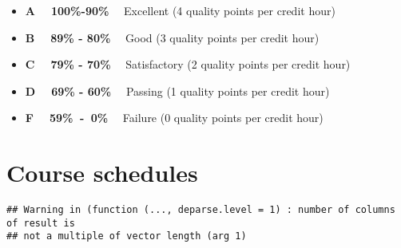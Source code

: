\documentclass[
]{article}
\providecommand{\tightlist}{%
  \setlength{\itemsep}{0pt}\setlength{\parskip}{0pt}}
\begin{document}
\begin{itemize}
\tightlist
\item
  \textbf{A \(~~~\) 100\%-90\%} \(~~~\) Excellent (4 quality points per
  credit hour)
\item
  \textbf{B \(~~~\) 89\% - 80\%} \(~~~\) Good (3 quality points per
  credit hour)
\item
  \textbf{C \(~~~\) 79\% - 70\%} \(~~~\) Satisfactory (2 quality points
  per credit hour)
\item
  \textbf{D \(~~~\) 69\% - 60\%} \(~~~\) Passing (1 quality points per
  credit hour)
\item
  \textbf{F \(~~~\) 59\% \(~\)-\(~\) 0\%} \(~~~\) Failure (0 quality
  points per credit hour)
\end{itemize}

\hypertarget{course-schedules}{%
\section{Course schedules}\label{course-schedules}}

\begin{verbatim}
## Warning in (function (..., deparse.level = 1) : number of columns of result is
## not a multiple of vector length (arg 1)
\end{verbatim}
\end{document}
